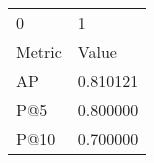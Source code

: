 \begin{tabular}{ll}
0 & 1 \\
Metric & Value \\
AP & 0.810121 \\
P@5 & 0.800000 \\
P@10 & 0.700000 \\
\end{tabular}
